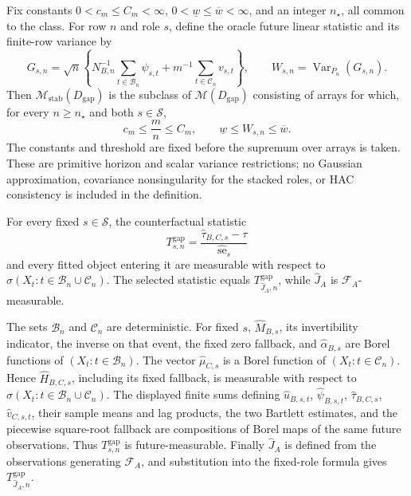 Fix constants \(0<c_m\leq C_m<\infty\), \(0<\underline w\leq\overline w<\infty\), and an integer \(n_\star\), all common to the class.  For row \(n\) and role \(s\), define the oracle future linear statistic and its finite-row variance by
\[
 G_{s,n}=\sqrt n\left\{
  N_{B,n}^{-1}\sum_{t\in\mathcal B_n}\psi_{s,t}
  +m^{-1}\sum_{t\in\mathcal C_n}v_{s,t}
 \right\},
 \qquad
 W_{s,n}=\operatorname{Var}_{P_n}(G_{s,n}).
\]
Then \(\mathcal M_{\mathrm{stab}}(D_{\mathrm{gap}})\) is the subclass of \(\mathcal M(D_{\mathrm{gap}})\) consisting of arrays for which, for every \(n\geq n_\star\) and both \(s\in\mathcal S\),
\[
 c_m\leq \frac mn\leq C_m,
 \qquad
 \underline w\leq W_{s,n}\leq\overline w.
\]
The constants and threshold are fixed before the supremum over arrays is taken.  These are primitive horizon and scalar variance restrictions; no Gaussian approximation, covariance nonsingularity for the stacked roles, or HAC consistency is included in the definition.

For every fixed \(s\in\mathcal S\), the counterfactual statistic
\[
 T_{s,n}^{\mathrm{gap}}
 =\frac{\widehat\tau_{B,C,s}-\tau}
        {\widehat{\operatorname{se}}_s}
\]
and every fitted object entering it are measurable with respect to \(\sigma(X_t:t\in\mathcal B_n\cup\mathcal C_n)\).  The selected statistic equals \(T_{\widehat J_A,n}^{\mathrm{gap}}\), while \(\widehat J_A\) is \(\mathcal F_A\)-measurable.

The sets \(\mathcal B_n\) and \(\mathcal C_n\) are deterministic.  For fixed \(s\), \(\widehat M_{B,s}\), its invertibility indicator, the inverse on that event, the fixed zero fallback, and \(\widehat\alpha_{B,s}\) are Borel functions of \((X_t:t\in\mathcal B_n)\).  The vector \(\widehat\mu_{C,s}\) is a Borel function of \((X_t:t\in\mathcal C_n)\).  Hence \(\widehat H_{B,C,s}\), including its fixed fallback, is measurable with respect to \(\sigma(X_t:t\in\mathcal B_n\cup\mathcal C_n)\).  The displayed finite sums defining \(\widehat u_{B,s,t}\), \(\widehat\psi_{B,s,t}\), \(\widehat\tau_{B,C,s}\), \(\widehat v_{C,s,t}\), their sample means and lag products, the two Bartlett estimates, and the piecewise square-root fallback are compositions of Borel maps of the same future observations.  Thus \(T_{s,n}^{\mathrm{gap}}\) is future-measurable.  Finally \(\widehat J_A\) is defined from the observations generating \(\mathcal F_A\), and substitution into the fixed-role formula gives \(T_{\widehat J_A,n}^{\mathrm{gap}}\).

